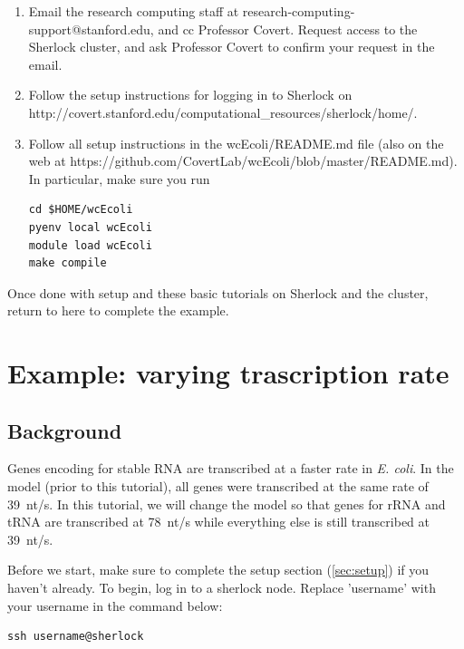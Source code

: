 \documentclass[12pt]{article}
\begin{document}
\begin{enumerate}
\item Email the research computing staff at research-computing-support@stanford.edu, and cc Professor Covert. Request access to the Sherlock cluster, and ask Professor Covert to confirm your request in the email.

\item Follow the setup instructions for logging in to Sherlock on
\linebreak
http://covert.stanford.edu/computational\_resources/sherlock/home/.

\item Follow all setup instructions in the wcEcoli/README.md file (also on the web at https://github.com/CovertLab/wcEcoli/blob/master/README.md). In particular, make sure you run
\lstset{language=bash}
\begin{lstlisting}
cd $HOME/wcEcoli
pyenv local wcEcoli
module load wcEcoli
make compile
\end{lstlisting}
\end{enumerate}

Once done with setup and these basic tutorials on Sherlock and the cluster, return to here to complete the example.



\section{Example: varying trascription rate}

\subsection{Background}

Genes encoding for stable RNA are transcribed at a faster rate in \textit{E. coli}. In the model (prior to this tutorial), all genes were transcribed at the same rate of 39~nt/s. In this tutorial, we will change the model so that genes for rRNA and tRNA are transcribed at 78~nt/s while everything else is still transcribed at 39~nt/s. 
\par

Before we start, make sure to complete the setup section (\ref{sec:setup}) if you haven't already. To begin, log in to a sherlock node. Replace 'username' with your username in the command below:

\lstset{language=bash}
\begin{lstlisting}
ssh username@sherlock
\end{lstlisting}
\end{document}
